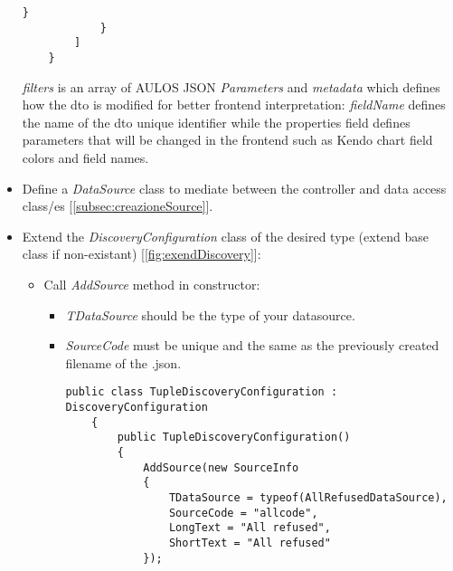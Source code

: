 \begin{itemize}
\begin{lstlisting}[caption={{sourcecode}.json example}, style=javaScriptCode]
                }
            }   
        ]
    }
    \end{lstlisting}
    \textit{filters} is an array of AULOS JSON \textit{Parameters} and \textit{metadata} which defines how the dto is modified for better frontend interpretation: \textit{fieldName} defines the name of the dto unique identifier while the properties field defines parameters that will be changed in the frontend such as Kendo chart field colors and field names.
    \item Define a \textit{DataSource} class to mediate between the controller and data access class/es [\ref{subsec:creazioneSource}].
    \item Extend the \textit{DiscoveryConfiguration} class of the desired type (extend base class if non-existant) [\ref{fig:exendDiscovery}]:
    \begin{itemize}
        \item Call \textit{AddSource} method in constructor:
        \begin{itemize}
            \item \textit{TDataSource} should be the type of your datasource.
            \item \textit{SourceCode} must be unique and the same as the previously created filename of the .json.
            \begin{lstlisting}[caption={TupleDiscoveryConfiguration example}, style=javaScriptCode]
public class TupleDiscoveryConfiguration : DiscoveryConfiguration
    {
        public TupleDiscoveryConfiguration()
        {
            AddSource(new SourceInfo
            {
                TDataSource = typeof(AllRefusedDataSource),
                SourceCode = "allcode",
                LongText = "All refused",
                ShortText = "All refused"
            });


\end{lstlisting}
\end{itemize}
\end{itemize}
\end{itemize}
